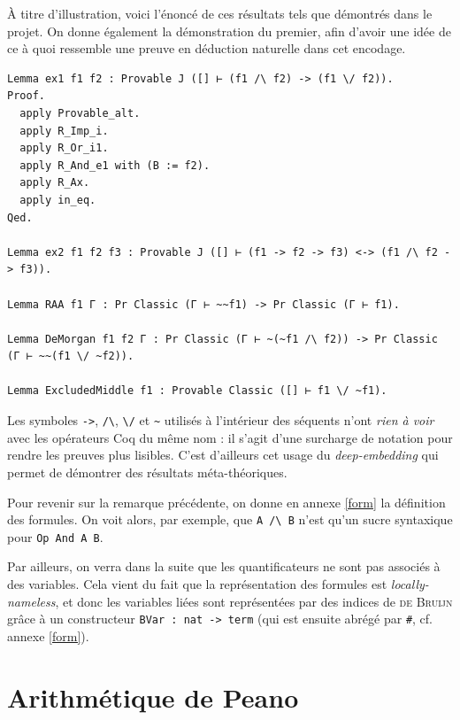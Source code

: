 \documentclass[a4paper]{article}
\theoremstyle{remark}
\theoremstyle{remark}
\theoremstyle{remark}
\theoremstyle{definition}
\theoremstyle{definition}
\theoremstyle{definition}
\begin{document}
\`A titre d'illustration, voici l'énoncé de ces résultats tels que démontrés dans le projet. On donne également la démonstration du premier, afin d'avoir une idée de ce à quoi ressemble une preuve en déduction naturelle dans cet encodage.

\begin{verbatim}
Lemma ex1 f1 f2 : Provable J ([] ⊢ (f1 /\ f2) -> (f1 \/ f2)).
Proof.
  apply Provable_alt.
  apply R_Imp_i.
  apply R_Or_i1.
  apply R_And_e1 with (B := f2).
  apply R_Ax.
  apply in_eq.
Qed.

Lemma ex2 f1 f2 f3 : Provable J ([] ⊢ (f1 -> f2 -> f3) <-> (f1 /\ f2 -> f3)).

Lemma RAA f1 Γ : Pr Classic (Γ ⊢ ~~f1) -> Pr Classic (Γ ⊢ f1).

Lemma DeMorgan f1 f2 Γ : Pr Classic (Γ ⊢ ~(~f1 /\ f2)) -> Pr Classic (Γ ⊢ ~~(f1 \/ ~f2)).

Lemma ExcludedMiddle f1 : Provable Classic ([] ⊢ f1 \/ ~f1).
\end{verbatim}

\noindent \begin{minipage}[t]{0.05\linewidth}
\dbend
\end{minipage} \begin{minipage}[c]{0.95\linewidth}
Les symboles \verb+->+, \verb+/\+, \verb+\/+ et \verb+~+ utilisés à l'intérieur des séquents n'ont \emph{rien à voir} avec les opérateurs Coq du même nom : il s'agit d'une surcharge de notation pour rendre les preuves plus lisibles. C'est d'ailleurs cet usage du \emph{deep-embedding} qui permet de démontrer des résultats méta-théoriques.
\end{minipage}
\smallskip

Pour revenir sur la remarque précédente, on donne en annexe \ref{form} la définition des formules. On voit alors, par exemple, que \verb+A /\ B+ n'est qu'un sucre syntaxique pour \verb+Op And A B+.

Par ailleurs, on verra dans la suite que les quantificateurs ne sont pas associés à des variables. Cela vient du fait que la représentation des formules est \emph{locally-nameless}, et donc les variables liées sont représentées par des indices de \textsc{de Bruijn} grâce à un constructeur \verb+BVar : nat -> term+ (qui est ensuite abrégé par \verb+#+, cf. annexe \ref{form}).


\section{Arithmétique de {\sc Peano}}
\end{document}
